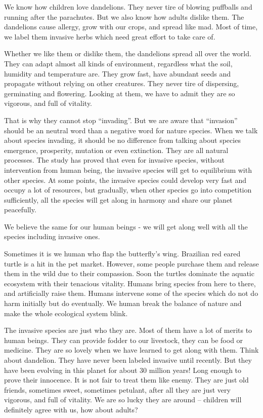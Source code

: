 \documentclass[12pt]{article}
\begin{document}
We know how children love dandelions.  They never tire of blowing puffballs and running after the parachutes.  But we also know how adults dislike them.  The dandelions cause allergy, grow with our crops, and spread like mad.  Most of time, we label them invasive herbs which need great effort to take care of.

Whether we like them or dislike them, the dandelions spread all over the world.  They can adapt almost all kinds of environment, regardless what the soil, humidity and temperature are.  They grow fast, have abundant seeds and propagate without relying on other creatures.  They never tire of dispersing, germinating and flowering.  Looking at them, we have to admit they are so vigorous, and full of vitality.

That is why they cannot stop ``invading''.  But we are aware that ``invasion'' should be an neutral word than a negative word for nature species.  When we talk about species invading, it should be no difference from talking about species emergence, prosperity, mutation or even extinction.  They are all natural processes.  The study has proved that even for invasive species, without intervention from human being, the invasive species will get to equilibrium with other species.  At some points, the invasive species could develop very fast and occupy a lot of resources, but gradually, when other species go into competition sufficiently, all the species will get along in harmony and share our planet peacefully.

We believe the same for our human beings - we will get along well with all the species including invasive ones.

Sometimes it is we human who flap the butterfly's wing.  Brazilian red eared turtle is a hit in the pet market. However, some people purchase them and release them in the wild due to their compassion. Soon the turtles dominate the aquatic ecosystem with their tenacious vitality.  Humans bring species from here to there, and artificially raise them.  Humans intervene some of the species which do not do harm initially but do eventually.  We human break the balance of nature and make the whole ecological system blink.

The invasive species are just who they are.  Most of them have a lot of merits to human beings.  They can provide fodder to our livestock, they can be food or medicine.  They are so lovely when we have learned to get along with them.  Think about dandelion.  They have never been labeled invasive until recently.  But they have been evolving in this planet for about 30 million years! Long enough to prove their innocence.  It is not fair to treat them like enemy.  They are just old friends, sometimes sweet, sometimes petulant, after all they are just very vigorous, and full of vitality.  We are so lucky they are around -- children will definitely agree with us, how about adults?

\newpage

{}
\newrefcontext
\printbibliography
\end{document}
